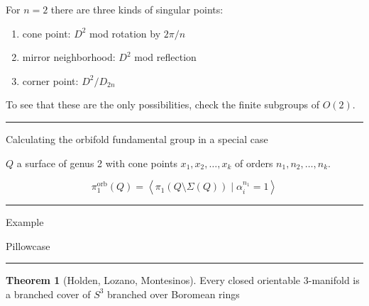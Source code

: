 \documentclass[12pt]{article}
\newcommand{\sepline}{\rule{\textwidth}{0.4pt}}
\theoremstyle{definition}
\newtheorem{theorem}{Theorem}
\newcommand{\<}{\left\langle}
\renewcommand{\>}{\right\rangle}
\newcommand{\orb}{\mathrm{orb}}
\begin{document}
For $n = 2$ there are three kinds of singular points:
\begin{enumerate}
    \item cone point: $D^2$ mod rotation by $2\pi/n$
    \item mirror neighborhood: $D^2$ mod reflection
    \item corner point: $D^2/D_{2n}$
\end{enumerate}

To see that these are the only possibilities, check the finite subgroups of $O(2)$.

\sepline

Calculating the orbifold fundamental group in a special case

$Q$ a surface of genus 2 with cone points $x_1, x_2, \dots, x_k$ of orders $n_1, n_2, \dots, n_k$.

\[
    \pi^\orb_1(Q) = \<\pi_1(Q \setminus \Sigma(Q)) \mid \alpha_i^{n_1} = 1\>
\]

\sepline

Example

Pillowcase

\sepline

\begin{theorem}[Holden, Lozano, Montesinos]
    Every closed orientable $3$-manifold is a branched cover of $S^3$ branched over Boromean rings
\end{theorem}
\end{document}
